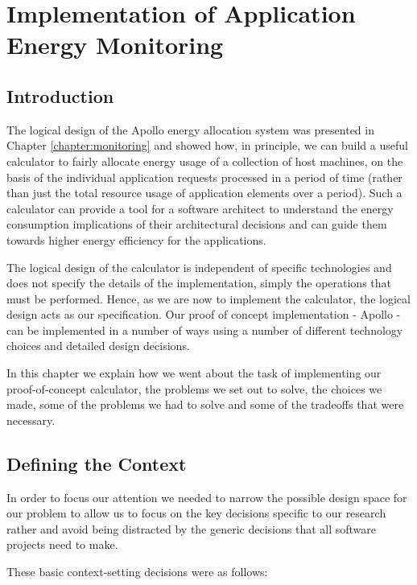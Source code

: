 \chapter{Implementation of Application Energy Monitoring}
\label{chapter:implementation}

\section{Introduction}
The logical design of the Apollo energy allocation system was presented in Chapter \ref{chapter:monitoring} and showed how, in principle, we can build a useful calculator to fairly allocate energy usage of a collection of host machines, on the basis of the individual application requests processed in a period of time (rather than just the total resource usage of application elements over a period).   Such a calculator can provide a tool for a software architect to understand the energy consumption implications of their architectural decisions and can guide them towards higher energy efficiency for the applications.

The logical design of the calculator is independent of specific technologies and does not specify the details of the implementation, simply the operations that must be performed.  Hence, as we are now to implement the calculator, the logical design acts as our specification.  Our proof of concept implementation - Apollo - can be implemented in a number of ways using a number of different technology choices and detailed design decisions.

In this chapter we explain how we went about the task of implementing our proof-of-concept calculator, the problems we set out to solve, the choices we made, some of the problems we had to solve and some of the tradeoffs that were necessary.

\section{Defining the Context}

In order to focus our attention we needed to narrow the possible design space for our problem to allow us to focus on the key decisions specific to our research rather and avoid being distracted by the generic decisions that all software projects need to make.

These basic context-setting decisions were as follows:


